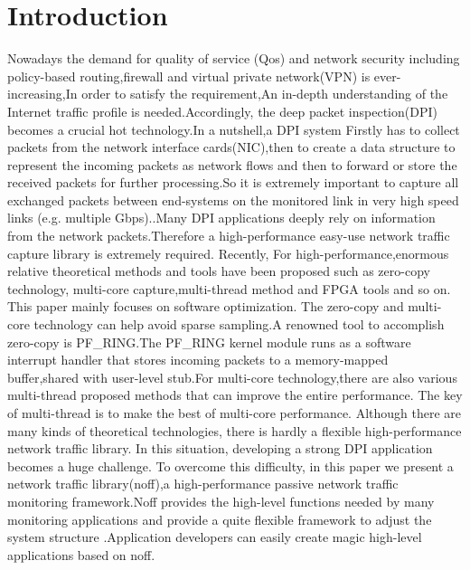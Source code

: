 \documentclass[conference]{IEEEtran}
\begin{document}
\section{Introduction}
Nowadays the demand for quality of service (Qos) and network security including policy-based routing,firewall and virtual private network(VPN) is ever-increasing\cite{IEEE:1},In order to satisfy the requirement,An in-depth understanding of the Internet traffic profile is needed.Accordingly, the deep packet inspection(DPI) becomes a crucial hot technology\cite{IEEE:2}.In a nutshell,a DPI system Firstly has to collect packets from the network interface cards(NIC),then to create a data structure to represent the incoming packets as network flows and then to forward or store the received packets for further processing.So it is extremely important to capture all exchanged packets between end-systems on the monitored link in very high speed links (e.g. multiple Gbps).\cite{IEEE:2}.Many DPI applications deeply rely on information from the network packets.Therefore a high-performance easy-use network traffic capture library is extremely required.
\newline\indent Recently, For high-performance,enormous relative theoretical methods and tools have been proposed such as zero-copy technology, multi-core capture,multi-thread method and FPGA tools\cite{IEEE:3} and so on. This paper mainly focuses on software optimization.
The zero-copy and multi-core technology can help avoid sparse sampling\cite{IEEE:4}.A renowned tool to accomplish zero-copy is PF\_RING\cite{IEEE:5}.The PF\_RING kernel module runs as a software interrupt handler that stores incoming packets to a memory-mapped buffer,shared with user-level stub.For multi-core technology,there are also various multi-thread proposed methods that can improve the entire performance.
The key of multi-thread is to make the best of multi-core performance.
\newline\indent Although there are many kinds of theoretical technologies, there is hardly a flexible high-performance network traffic library. In this situation, developing a strong DPI application becomes a huge challenge.
\newline\indent To overcome this difficulty, in this paper we present a network traffic library(noff),a high-performance passive network traffic monitoring framework.Noff provides the high-level functions needed by many monitoring applications and provide a quite flexible framework to adjust the system structure .Application developers can easily create magic high-level applications based on noff.
\end{document}
